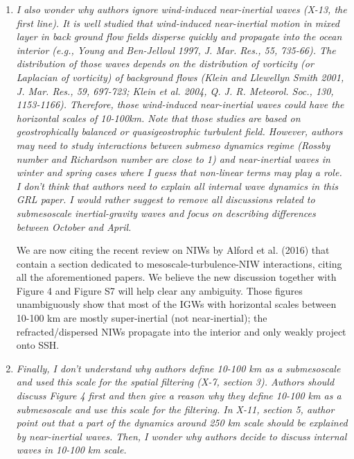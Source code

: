 \documentclass[11pt]{article}
\newcommand{\bdp}{\begin{description}}
\newcommand{\edp}{\end{description}}
\begin{document}
\begin{enumerate}
  \item {\it I also wonder why authors ignore wind-induced near-inertial waves (X-13, the first
        line). It is well studied that wind-induced near-inertial motion in mixed layer in back
        ground flow fields disperse quickly and propagate into the ocean interior (e.g., Young
        and Ben-Jelloul 1997, J. Mar. Res., 55, 735-66). The distribution of those waves
        depends on the distribution of vorticity (or Laplacian of vorticity) of background
        flows (Klein and Llewellyn Smith 2001, J. Mar. Res., 59, 697-723; Klein et al. 2004, Q.
        J. R. Meteorol. Soc., 130, 1153-1166). Therefore, those wind-induced near-inertial
        waves could have the horizontal scales of 10-100km. Note that those studies are based
        on geostrophically balanced or quasigeostrophic turbulent field. However, authors
        may need to study interactions between submeso dynamics regime (Rossby number
        and Richardson number are close to 1) and near-inertial waves in winter and spring
        cases where I guess that non-linear terms may play a role. I don't think that authors
        need to explain all internal wave dynamics in this GRL paper. I would rather suggest
        to remove all discussions related to submesoscale inertial-gravity waves and focus on
        describing differences between October and April.}\\

        \bdp
            We are now citing the recent review on NIWs by Alford et al. (2016) that contain
            a section dedicated to mesoscale-turbulence-NIW interactions, citing all the
            aforementioned papers. We believe the new discussion together with Figure 4
            and Figure S7 will help clear any ambiguity. Those figures unambiguously
            show that most of the IGWs with horizontal scales between 10-100 km
            are mostly super-inertial (not near-inertial); the refracted/dispersed  NIWs
            propagate into the interior and only weakly project onto SSH.
        \edp

  \item {\it Finally, I don't understand why authors define 10-100 km as a submesoscale and used
        this scale for the spatial filtering (X-7, section 3). Authors should discuss Figure 4 first
        and then give a reason why they define 10-100 km as a submesoscale and use this
        scale for the filtering. In X-11, section 5, author point out that a part of the dynamics
        around 250 km scale should be explained by near-inertial waves. Then, I wonder why
        authors decide to discuss internal waves in 10-100 km scale.}


\end{enumerate}
\end{document}
